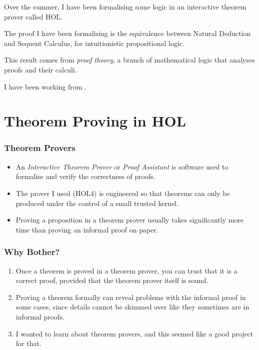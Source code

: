 \documentclass[english,svgnames,hide notes,12pt]{beamer}
\title{\large\presentationtitle}
\author{Alexander Cox\\
		\small Supervised by Michael Norrish\\
		\small The Australian National University
	}
\date{\today}
\theoremstyle{definition}
\theoremstyle{remark}
\begin{document}
\thispagestyle{empty}
\begin{frame}
    \titlepage{}
\end{frame}

\begin{frame}
    Over the summer, I have been formalising some logic in an interactive theorem prover called HOL.

    \bigskip
    The proof I have been formalising is the equivalence between Natural Deduction and Sequent Calculus, for intuitionistic propositional logic.

    \bigskip
    This result comes from \emph{proof theory}, a branch of mathematical logic that analyses proofs and their calculi.

    \bigskip
    I have been working from .
\end{frame}

\section{Theorem Proving in HOL}

\begin{frame}
    \frametitle{Theorem Provers}
    \begin{itemize}
        \item An \emph{Interactive Theorem Prover} or \emph{Proof Assistant} is software used to formalise and verify the correctness of proofs.
        \item The prover I used (HOL4) is engineered so that theorems can only be produced under the control of a small trusted kernel.
        \item Proving a proposition in a theorem prover usually takes significantly more time than proving an informal proof on paper.
    \end{itemize}
\end{frame}

\begin{frame}
    \frametitle{Why Bother?}
    \begin{enumerate}
        \item Once a theorem is proved in a theorem prover, you can trust that it is a correct proof, provided that the theorem prover itself is sound.
        \item Proving a theorem formally can reveal problems with the informal proof in some cases, since details cannot be skimmed over like they sometimes are in informal proofs.
        \item I wanted to learn about theorem provers, and this seemed like a good project for that.
    \end{enumerate}
\end{frame}
\end{document}
